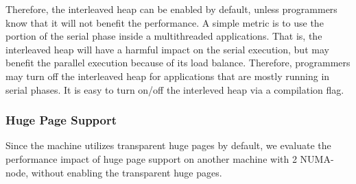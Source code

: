 Therefore, the interleaved heap can be enabled by default, unless programmers know that it will not benefit the performance. A simple metric is to use the portion of the serial phase inside a multithreaded applications.  That is, the interleaved heap will have a harmful impact on the serial execution, but may benefit the parallel execution because of its load balance. Therefore, programmers may turn off the interleaved heap for applications that are mostly running in serial phases. It is easy to turn on/off the interleved heap via a compilation flag.  








\subsubsection{Huge Page Support} 
\label{sec:hugepage}

Since the machine utilizes transparent huge pages by default, we evaluate the performance impact of huge page support on another machine with 2 NUMA-node, without enabling the transparent huge pages.

